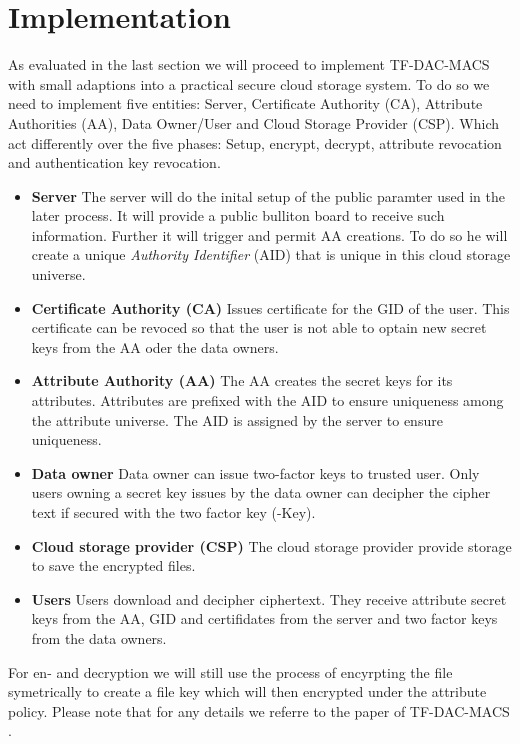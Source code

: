 \section{Implementation}
As evaluated in the last section we will proceed to implement TF-DAC-MACS with small adaptions into a practical secure cloud storage system. To do so we need to implement five entities: Server, Certificate Authority (CA), Attribute Authorities (AA), Data Owner/User and Cloud Storage Provider (CSP). Which act differently over the five phases: Setup, encrypt, decrypt, attribute revocation and authentication key revocation. 

\begin{itemize}
	\item \textbf{Server} The server will do the inital setup of the public paramter used in the later process. It will provide a public bulliton board to receive such information. Further it will trigger and permit AA creations. To do so he will create a unique \textit{Authority Identifier} (\ac{AID}) that is unique in this cloud storage universe. 
	\item \textbf{Certificate Authority (\ac{CA})} Issues certificate for the GID of the user. This certificate can be revoced so that the user is not able to optain new secret keys from the AA oder the data owners.
	\item \textbf{Attribute Authority (\ac{AA})} The AA creates the secret keys for its attributes. Attributes are prefixed with the \ac{AID} to ensure uniqueness among the attribute universe. The AID is assigned by the server to ensure uniqueness.
	\item \textbf{Data owner} Data owner can issue two-factor keys to trusted user. Only users owning a secret key issues by the data owner can decipher the cipher text if secured with the two factor key (-Key).
	\item \textbf{Cloud storage provider (\ac{CSP})} The cloud storage provider provide storage to save the encrypted files.
	\item \textbf{Users} Users download and decipher ciphertext. They receive attribute secret keys from the AA, GID and certifidates from the server and two factor keys from the data owners.
\end{itemize}

For en- and decryption we will still use the process of encyrpting the file symetrically to create a file key which will then encrypted under the attribute policy. Please note that for any details we referre to the paper of TF-DAC-MACS \cite{li2017two}.

